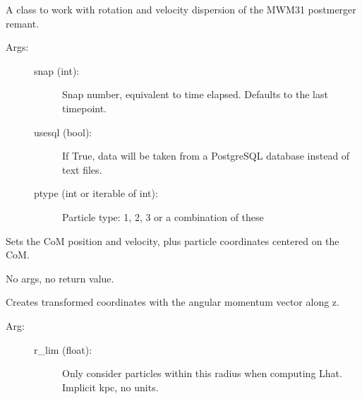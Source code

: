 \documentclass[letterpaper,10pt,english]{sphinxmanual}
\begin{document}
\begin{fulllineitems}
\label{\detokenize{remvdisp:galaxy.remvdisp.Vdisp}}
A class to work with rotation and velocity dispersion of the MW\sphinxhyphen{}M31 
post\sphinxhyphen{}merger remant.
\begin{description}
\item[{Args:}] \leavevmode\begin{description}
\item[{snap (int):}] \leavevmode
Snap number, equivalent to time elapsed. 
Defaults to the last timepoint.

\item[{usesql (bool):}] \leavevmode
If True, data will be taken from a PostgreSQL database instead of
text files.

\item[{ptype (int or iterable of int):}] \leavevmode
Particle type: 1, 2, 3 or a combination of these

\end{description}

\end{description}

\begin{fulllineitems}
\label{\detokenize{remvdisp:galaxy.remvdisp.Vdisp.calc_centered}}
Sets the CoM position and velocity, plus particle coordinates centered on the CoM.

No args, no return value.

\end{fulllineitems}


\begin{fulllineitems}
\label{\detokenize{remvdisp:galaxy.remvdisp.Vdisp.rotate}}
Creates transformed coordinates with the angular momentum vector along z.
\begin{description}
\item[{Arg:}] \leavevmode\begin{description}
\item[{r\_lim (float):}] \leavevmode
Only consider particles within this radius when computing L\sphinxhyphen{}hat. 
Implicit kpc, no units.


\end{description}
\end{description}
\end{fulllineitems}
\end{fulllineitems}
\end{document}
